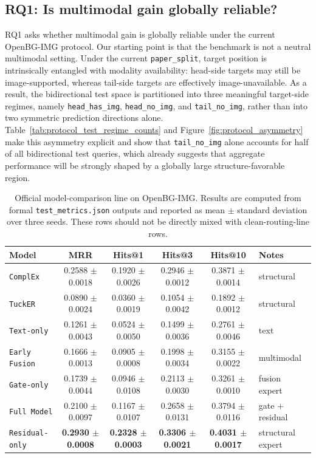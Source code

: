 \documentclass[11pt]{article}
\begin{document}
\subsection{RQ1: Is multimodal gain globally reliable?}
RQ1 asks whether multimodal gain is globally reliable under the current OpenBG-IMG protocol. Our starting point is that the benchmark is not a neutral multimodal setting. Under the current \texttt{paper\_split}, target position is intrinsically entangled with modality availability: head-side targets may still be image-supported, whereas tail-side targets are effectively image-unavailable. As a result, the bidirectional test space is partitioned into three meaningful target-side regimes, namely \texttt{head\_has\_img}, \texttt{head\_no\_img}, and \texttt{tail\_no\_img}, rather than into two symmetric prediction directions alone. Table~\ref{tab:protocol_test_regime_counts} and Figure~\ref{fig:protocol_asymmetry} make this asymmetry explicit and show that \texttt{tail\_no\_img} alone accounts for half of all bidirectional test queries, which already suggests that aggregate performance will be strongly shaped by a globally large structure-favorable region.

\begin{table}[H]
\centering
\caption{Official model-comparison line on OpenBG-IMG. Results are computed from formal \texttt{test\_metrics.json} outputs and reported as mean $\pm$ standard deviation over three seeds. These rows should not be directly mixed with clean-routing-line rows.}
\label{tab:official_model_comparison}
\scriptsize
\setlength{\tabcolsep}{1.5pt}
\begin{tabular}{p{}ccccp{}}
\toprule
Model & MRR & Hits@1 & Hits@3 & Hits@10 & Notes \\
\midrule
\texttt{ComplEx} & 0.2588 $\pm$ 0.0018 & 0.1920 $\pm$ 0.0026 & 0.2946 $\pm$ 0.0012 & 0.3871 $\pm$ 0.0014 & structural \\
\texttt{TuckER} & 0.0890 $\pm$ 0.0024 & 0.0360 $\pm$ 0.0019 & 0.1054 $\pm$ 0.0042 & 0.1892 $\pm$ 0.0012 & structural \\
\texttt{Text-only} & 0.1261 $\pm$ 0.0043 & 0.0524 $\pm$ 0.0050 & 0.1499 $\pm$ 0.0036 & 0.2761 $\pm$ 0.0046 & text \\
\texttt{Early Fusion} & 0.1666 $\pm$ 0.0013 & 0.0905 $\pm$ 0.0008 & 0.1998 $\pm$ 0.0034 & 0.3155 $\pm$ 0.0022 & multimodal \\
\texttt{Gate-only} & 0.1739 $\pm$ 0.0044 & 0.0946 $\pm$ 0.0108 & 0.2113 $\pm$ 0.0030 & 0.3261 $\pm$ 0.0010 & fusion expert \\
\texttt{Full Model} & 0.2100 $\pm$ 0.0097 & 0.1167 $\pm$ 0.0107 & 0.2658 $\pm$ 0.0131 & 0.3794 $\pm$ 0.0116 & gate + residual \\
\texttt{Residual-only} & \textbf{0.2930 $\pm$ 0.0008} & \textbf{0.2328 $\pm$ 0.0003} & \textbf{0.3306 $\pm$ 0.0021} & \textbf{0.4031 $\pm$ 0.0017} & structural expert \\
\bottomrule
\end{tabular}
\end{table}
\end{document}
